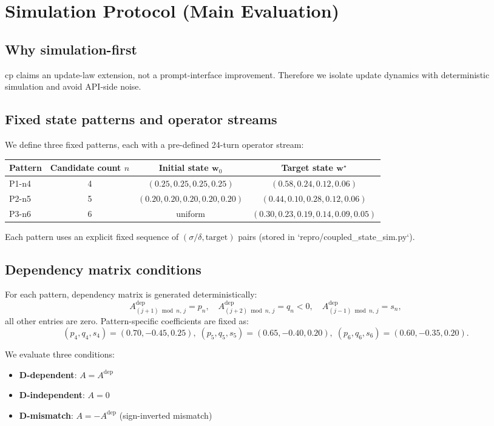 \documentclass[11pt,a4paper]{article}
\begin{document}
\section{Simulation Protocol (Main Evaluation)}
\subsection{Why simulation-first}
cp claims an update-law extension, not a prompt-interface improvement. Therefore we isolate update dynamics with deterministic simulation and avoid API-side noise.

\subsection{Fixed state patterns and operator streams}
We define three fixed patterns, each with a pre-defined 24-turn operator stream:
\begin{center}
\begin{tabular}{@{}lccc@{}}
\toprule
Pattern & Candidate count \(n\) & Initial state \(\mathbf{w}_0\) & Target state \(\mathbf{w}^{\star}\) \\
\midrule
P1-n4 & 4 & $(0.25,0.25,0.25,0.25)$ & $(0.58,0.24,0.12,0.06)$ \\
P2-n5 & 5 & $(0.20,0.20,0.20,0.20,0.20)$ & $(0.44,0.10,0.28,0.12,0.06)$ \\
P3-n6 & 6 & uniform & $(0.30,0.23,0.19,0.14,0.09,0.05)$ \\
\bottomrule
\end{tabular}
\end{center}
Each pattern uses an explicit fixed sequence of \((\sigma/\delta,\text{target})\) pairs (stored in `repro/coupled\_state\_sim.py`).

\subsection{Dependency matrix conditions}
For each pattern, dependency matrix is generated deterministically:
\[
A^{\mathrm{dep}}_{(j+1)\bmod n,\,j}=p_n,\quad
A^{\mathrm{dep}}_{(j+2)\bmod n,\,j}=q_n<0,\quad
A^{\mathrm{dep}}_{(j-1)\bmod n,\,j}=s_n,
\]
all other entries are zero.
Pattern-specific coefficients are fixed as:
\[
(p_4,q_4,s_4)=(0.70,-0.45,0.25),\;
(p_5,q_5,s_5)=(0.65,-0.40,0.20),\;
(p_6,q_6,s_6)=(0.60,-0.35,0.20).
\]

We evaluate three conditions:
\begin{itemize}
  \item \textbf{D-dependent}: \(A=A^{\mathrm{dep}}\)
  \item \textbf{D-independent}: \(A=0\)
  \item \textbf{D-mismatch}: \(A=-A^{\mathrm{dep}}\) (sign-inverted mismatch)
\end{itemize}
\end{document}
